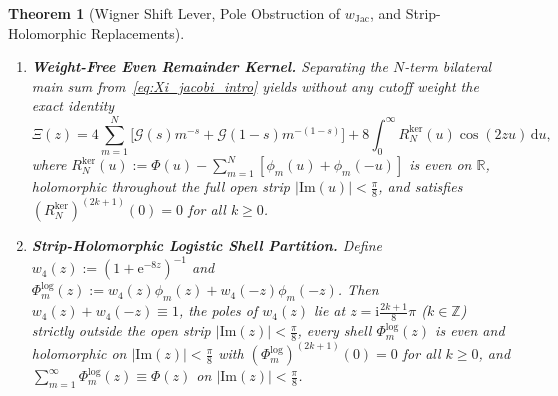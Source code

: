 \documentclass[11pt,reqno]{amsart}
\newtheorem{theorem}{Theorem}[section]
\theoremstyle{definition}
\theoremstyle{remark}
\numberwithin{equation}{section}
\newcommand{\R}{\mathbb{R}}
\newcommand{\Z}{\mathbb{Z}}
\newcommand{\dd}{\mathrm{d}}
\newcommand{\ii}{\mathrm{i}}
\newcommand{\ee}{\mathrm{e}}
\newcommand{\Ima}{\mathrm{Im}}
\begin{document}
\begin{theorem}[Wigner Shift Lever, Pole Obstruction of $w_{\mathrm{Jac}}$, and Strip-Holomorphic Replacements]
\begin{enumerate}[label=\textup{(\roman*)},leftmargin=2.2em]
\item \textbf{Weight-Free Even Remainder Kernel.} Separating the $N$-term bilateral main sum from~\eqref{eq:Xi_jacobi_intro} yields without any cutoff weight the exact identity
\begin{equation}\label{eq:RS_weight_free}
\Xi(z) = 4\sum_{m=1}^{N} \bigl[\mathcal{G}(s)m^{-s} + \mathcal{G}(1-s)m^{-(1-s)}\bigr] + 8\int_0^{\infty} R_N^{\mathrm{ker}}(u)\cos(2zu)\,\dd u,
\end{equation}
where $R_N^{\mathrm{ker}}(u) := \Phi(u) - \sum_{m=1}^N [\phi_m(u) + \phi_m(-u)]$ is even on $\R$, holomorphic throughout the full open strip $\lvert\Ima(u)\rvert < \frac{\pi}{8}$, and satisfies $(R_N^{\mathrm{ker}})^{(2k+1)}(0) = 0$ for all $k \ge 0$.
\item \textbf{Strip-Holomorphic Logistic Shell Partition.} Define $w_4(z) := (1 + \ee^{-8z})^{-1}$ and $\Phi_m^{\mathrm{log}}(z) := w_4(z)\phi_m(z) + w_4(-z)\phi_m(-z)$. Then $w_4(z) + w_4(-z) \equiv 1$, the poles of $w_4(z)$ lie at $z = \ii\frac{2k+1}{8}\pi$ ($k \in \Z$) strictly outside the open strip $\lvert\Ima(z)\rvert < \frac{\pi}{8}$, every shell $\Phi_m^{\mathrm{log}}(z)$ is even and holomorphic on $\lvert\Ima(z)\rvert < \frac{\pi}{8}$ with $(\Phi_m^{\mathrm{log}})^{(2k+1)}(0) = 0$ for all $k \ge 0$, and $\sum_{m=1}^{\infty} \Phi_m^{\mathrm{log}}(z) \equiv \Phi(z)$ on $\lvert\Ima(z)\rvert < \frac{\pi}{8}$.
\end{enumerate}
\end{theorem}
\end{document}

